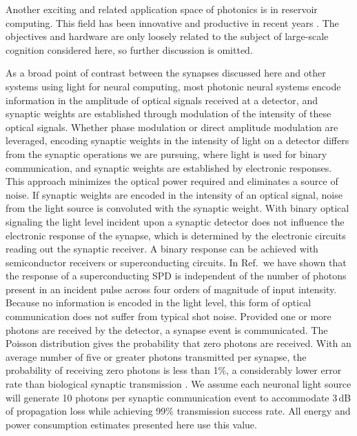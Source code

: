 \documentclass[twocolumn]{article}
\newcommand{\onlinecite}[1]{\hspace{-1 ex} \nocite{#1}\citenum{#1}}
\begin{document}
Another exciting and related application space of photonics is in reservoir computing. This field has been innovative and productive in recent years \cite{funa1993,vada2011,orso2015,vabr2017,brpe2018}. The objectives and hardware are only loosely related to the subject of large-scale cognition considered here, so further discussion is omitted. 

As a broad point of contrast between the synapses discussed here and other systems using light for neural computing, most photonic neural systems encode information in the amplitude of optical signals received at a detector, and synaptic weights are established through modulation of the intensity of these optical signals. Whether phase modulation or direct amplitude modulation are leveraged, encoding synaptic weights in the intensity of light on a detector differs from the synaptic operations we are pursuing, where light is used for binary communication, and synaptic weights are established by electronic responses. This approach minimizes the optical power required and eliminates a source of noise. If synaptic weights are encoded in the intensity of an optical signal, noise from the light source is convoluted with the synaptic weight. With binary optical signaling the light level incident upon a synaptic detector does not influence the electronic response of the synapse, which is determined by the electronic circuits reading out the synaptic receiver. A binary response can be achieved with semiconductor receivers or superconducting circuits. In Ref.\,\onlinecite{buta2020_2} we have shown that the response of a superconducting SPD is independent of the number of photons present in an incident pulse across four orders of magnitude of input intensity. Because no information is encoded in the light level, this form of optical communication does not suffer from typical shot noise. Provided one or more photons are received by the detector, a synapse event is communicated. The Poisson distribution gives the probability that zero photons are received. With an average number of five or greater photons transmitted per synapse, the probability of receiving zero photons is less than 1\%, a considerably lower error rate than biological synaptic transmission \cite{li1997}. We assume each neuronal light source will generate 10 photons per synaptic communication event to accommodate 3\,dB of propagation loss while achieving 99\% transmission success rate. All energy and power consumption estimates presented here use this value.
\end{document}
